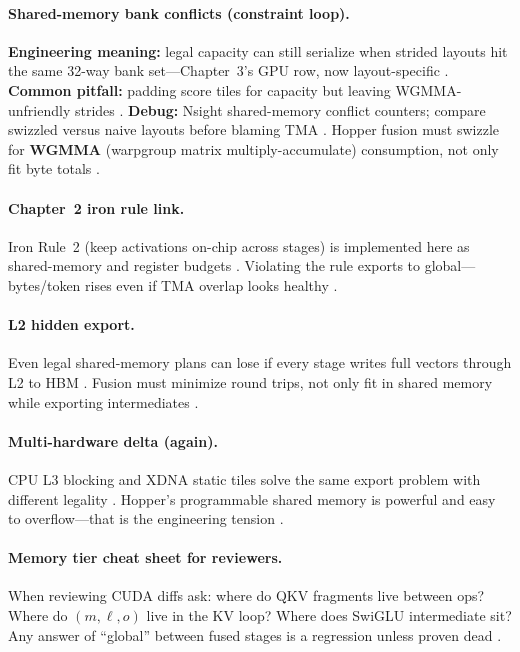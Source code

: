 \paragraph{Shared-memory bank conflicts (constraint loop).}
\textbf{Engineering meaning:} legal capacity can still serialize when strided layouts hit the same 32-way bank set---Chapter~3's GPU row, now layout-specific \citep{nvidia2022hopper,shah2024flashattention3}.
\textbf{Common pitfall:} padding score tiles for capacity but leaving WGMMA-unfriendly strides \citep{dao2022flashattention}.
\textbf{Debug:} Nsight shared-memory conflict counters; compare swizzled versus naive layouts before blaming TMA \citep{yirage2026,patel2025llminference}.
Hopper fusion must swizzle for \textbf{WGMMA} (warpgroup matrix multiply-accumulate) consumption, not only fit byte totals \citep{semianalysis2024tma,shah2024flashattention3}.

\paragraph{Chapter~2 iron rule link.}
Iron Rule~2 (keep activations on-chip across stages) is implemented here as shared-memory and register budgets \citep{chen2020compilerbasedhardw,memoryfloor2026,dao2022flashattention}.
Violating the rule exports to global---bytes/token rises even if TMA overlap looks healthy \citep{semianalysis2024tma,taxbreak2026}.

\paragraph{L2 hidden export.}
Even legal shared-memory plans can lose if every stage writes full vectors through L2 to HBM \citep{memoryfloor2026,kwon2023vllm}.
Fusion must minimize round trips, not only fit in shared memory while exporting intermediates \citep{chen2020compilerbasedhardw,dao2022flashattention,yirage2026}.

\paragraph{Multi-hardware delta (again).}
CPU L3 blocking and XDNA static tiles solve the same export problem with different legality \citep{amd2024xdna,dlbook,rotem2018glow,patel2025llminference}.
Hopper's programmable shared memory is powerful and easy to overflow---that is the engineering tension \citep{nvidia2022hopper,yirage2026,memoryfloor2026}.

\paragraph{Memory tier cheat sheet for reviewers.}
When reviewing CUDA diffs ask: where do QKV fragments live between ops? Where do $(m,\ell,o)$ live in the KV loop? Where does SwiGLU intermediate sit? \citep{dao2022flashattention,memoryfloor2026,yirage2026}
Any answer of ``global'' between fused stages is a regression unless proven dead \citep{chen2020compilerbasedhardw,taxbreak2026}.

